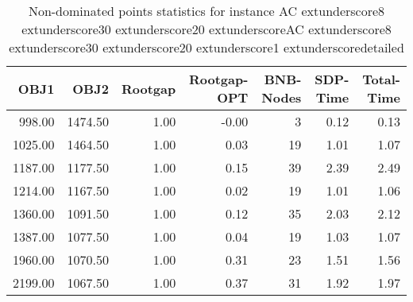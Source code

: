 \begin{table}
\caption{Non-dominated points statistics for instance AC	extunderscore8	extunderscore30	extunderscore20	extunderscoreAC	extunderscore8	extunderscore30	extunderscore20	extunderscore1	extunderscoredetailed}
\label{tab:stats/AC_8_30_20_AC_8_30_20_1_detailed}
\begin{tabular}{rrrrrrr}
\toprule
OBJ1 & OBJ2 & Rootgap & Rootgap-OPT & BNB-Nodes & SDP-Time & Total-Time \\
\midrule
998.00 & 1474.50 & 1.00 & -0.00 & 3 & 0.12 & 0.13 \\
1025.00 & 1464.50 & 1.00 & 0.03 & 19 & 1.01 & 1.07 \\
1187.00 & 1177.50 & 1.00 & 0.15 & 39 & 2.39 & 2.49 \\
1214.00 & 1167.50 & 1.00 & 0.02 & 19 & 1.01 & 1.06 \\
1360.00 & 1091.50 & 1.00 & 0.12 & 35 & 2.03 & 2.12 \\
1387.00 & 1077.50 & 1.00 & 0.04 & 19 & 1.03 & 1.07 \\
1960.00 & 1070.50 & 1.00 & 0.31 & 23 & 1.51 & 1.56 \\
2199.00 & 1067.50 & 1.00 & 0.37 & 31 & 1.92 & 1.97 \\
\bottomrule
\end{tabular}
\end{table}
